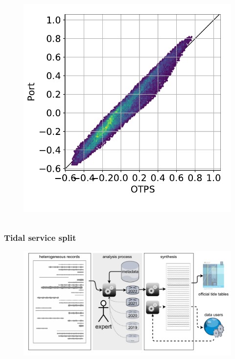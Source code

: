 \begin{frame}
\begin{columns}
\begin{column}{0.3\textwidth}
\begin{figure}
        \\
        \includegraphics[height=0.25\textheight]{figures/plots/compareTides_61561_2020_105.pdf}
      \end{figure}
    \end{column}
\end{columns}
\end{frame}
\begin{frame}
\frametitle{Tidal service split}
      \begin{figure}      
        \includegraphics[height=0.6\textheight]{figures/diagrams/tideSchematic.pdf}
      \end{figure}
\end{frame}